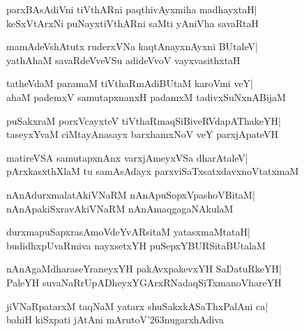 \documentclass[twoside,12pt,openright]{book}
\def\S{\char'263}
\newcounter{shloka}[chapter]
\begin{document}
\begin{shloka}%
parxBAsAdiVni tiVthARni paqthivAyxmiha madhayxtaH|\\
keSxVtArxNi puNayxtiVthARni saMti yAniVha savaRtaH
\end{shloka}

\begin{shloka}%
mamAdeVshAtutx ruderxVNa kaqtAnayxnAyxni BUtaleV|\\
yathAhaM savaRdeVveVSu adideVvoV vayxvasithxtaH
\end{shloka}

\begin{shloka}%
tatheVdaM paramaM tiVthaRmAdiBUtaM karoVmi veY|\\
ahaM pademxV samutapxnanxH padamxM tadivxSuNxnABijaM
\end{shloka}

\begin{shloka}%
puSakxraM porxVcayxteV tiVthaRmaqSiBiveRVdapAThakeYH|\\
taseyxYvaM ciMtayAnasayx barxhamxNoV veY parxjApateVH
\end{shloka}

\begin{shloka}%
matireVSA samutapxnAnx varxjAmeyxVSa dharAtaleV|\\
pArxkasxthXlaM tu samAsAdayx parxviSaTxsatxdavxnoVtatxmaM
\end{shloka}

\begin{shloka}%
nAnAdurxmalatAkiVNaRM nAnApuSopxVpashoVBitaM|\\
nAnApakiSxravAkiVNaRM nAnAmaqgagaNAkulaM
\end{shloka}

\begin{shloka}%
durxmapuSapxrasAmoVdeYvARsitaM yatasxmaMtataH|\\
budidhxpUvaRmiva nayxsetxYH puSepxYBURSitaBUtalaM
\end{shloka}

\begin{shloka}%
nAnAgaMdharaseYraneyxYH pakAvxpakevxYH SaDatuRkeYH|\\
PaleYH suvaNaRrUpADheyxYGArxRNadaqSiTxmanoVhareYH
\end{shloka}

\begin{shloka}%
jiVNaRpatarxM taqNaM yatarx shuSakxkASaThxPalAni ca|\\
bahiH kiSxpati jAtAni mArutoV\S nugarxhAdiva
\end{shloka}
\end{document}

